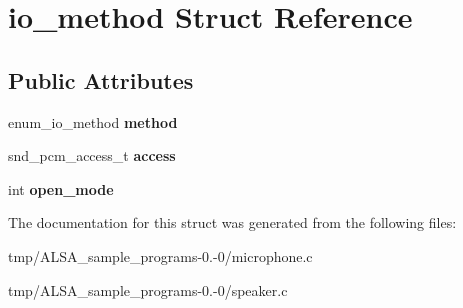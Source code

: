 \hypertarget{structio__method}{\section{io\-\_\-method \-Struct \-Reference}
\label{structio__method}
}
\subsection*{\-Public \-Attributes}
\begin{DoxyCompactItemize}
\item 
\hypertarget{structio__method_a9fa7243153fb0e9c77a674c556de1480}{enum\-\_\-io\-\_\-method {\bfseries method}}\label{structio__method_a9fa7243153fb0e9c77a674c556de1480}

\item 
\hypertarget{structio__method_a4d06c703659848ccbe17476f168dcde1}{snd\-\_\-pcm\-\_\-access\-\_\-t {\bfseries access}}\label{structio__method_a4d06c703659848ccbe17476f168dcde1}

\item 
\hypertarget{structio__method_aefd7fc462b7f43b474200b3f3ef92a05}{int {\bfseries open\-\_\-mode}}\label{structio__method_aefd7fc462b7f43b474200b3f3ef92a05}

\end{DoxyCompactItemize}


\-The documentation for this struct was generated from the following files\-:\begin{DoxyCompactItemize}
\item 
tmp/\-A\-L\-S\-A\-\_\-sample\-\_\-programs-\/0.-\/0/microphone.\-c\item 
tmp/\-A\-L\-S\-A\-\_\-sample\-\_\-programs-\/0.-\/0/speaker.\-c\end{DoxyCompactItemize}
